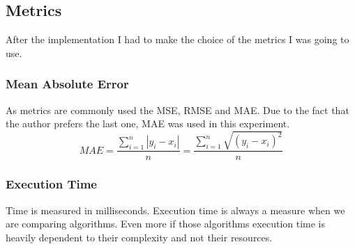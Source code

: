 \subsection{Metrics}
After the implementation I had to make the choice of the metrics I was going to use.
\subsubsection{Mean Absolute Error}
As metrics are commonly used the MSE, RMSE and MAE. Due to the fact that the author prefers the last one, MAE was used in this experiment.
\begin{equation}
MAE = \frac{\sum_{i=1}^{n}{|y_{i}-x_{i}|} }{n} = \frac{\sum_{i=1}^{n}\sqrt{{(y_{i}-x_{i})}^{2}}}{n}
\end{equation}
\subsubsection{Execution Time}
Time is measured in milliseconds.
Execution time is always a measure when we are comparing algorithms. 
Even more if those algorithms execution time is heavily dependent to their complexity and not their resources.
